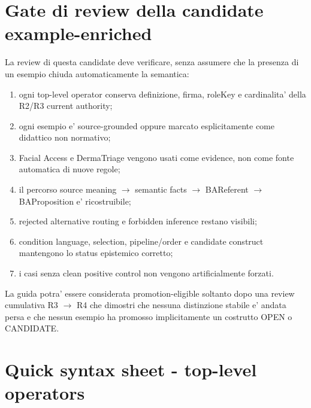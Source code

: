 \documentclass[11pt,a4paper]{article}
\providecommand{\Rtwentyfivetag}{\ddtatag{DDTATeal}{R25 EVIDENCE}}
\begin{document}
\section{Gate di review della candidate example-enriched}
\Rtwentyfivetag

La review di questa candidate deve verificare, senza assumere che la presenza di un esempio chiuda automaticamente la semantica:
\begin{enumerate}
  \item ogni top-level operator conserva definizione, firma, roleKey e cardinalita' della R2/R3 current authority;
  \item ogni esempio e' source-grounded oppure marcato esplicitamente come didattico non normativo;
  \item Facial Access e DermaTriage vengono usati come evidence, non come fonte automatica di nuove regole;
  \item il percorso source meaning $\rightarrow$ semantic facts $\rightarrow$ BAReferent $\rightarrow$ BAProposition e' ricostruibile;
  \item rejected alternative routing e forbidden inference restano visibili;
  \item condition language, selection, pipeline/order e candidate construct mantengono lo status epistemico corretto;
  \item i casi senza clean positive control non vengono artificialmente forzati.
\end{enumerate}

\begin{ddtacore}[title={Acceptance criterion della candidate example-enriched}]
La guida potra' essere considerata promotion-eligible soltanto dopo una review cumulativa R3 $\rightarrow$ R4 che dimostri che nessuna distinzione stabile e' andata persa e che nessun esempio ha promosso implicitamente un costrutto OPEN o CANDIDATE.
\end{ddtacore}

\appendix
\section{Quick syntax sheet - top-level operators}
\end{document}
